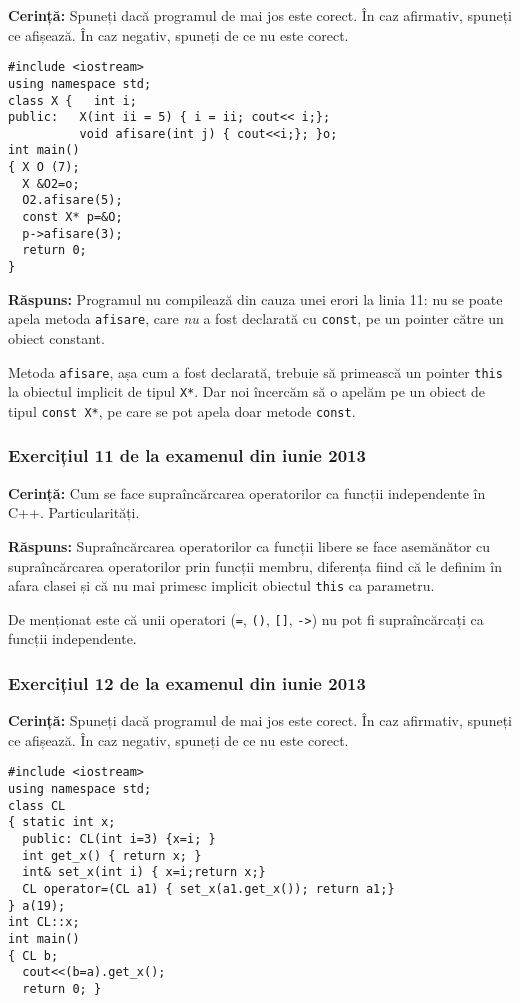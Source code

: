 \textbf{Cerință:} Spuneți dacă programul de mai jos este corect. În caz afirmativ, spuneți ce afișează. În caz negativ, spuneți de ce nu este corect.
\begin{lstlisting}
#include <iostream>
using namespace std;
class X {   int i;
public:   X(int ii = 5) { i = ii; cout<< i;};
          void afisare(int j) { cout<<i;}; }o;
int main()
{ X O (7);
  X &O2=o;
  O2.afisare(5);
  const X* p=&O;
  p->afisare(3);
  return 0;
}
\end{lstlisting}

\textbf{Răspuns:} Programul nu compilează din cauza unei erori la linia 11: nu se poate apela metoda \texttt{afisare}, care \emph{nu} a fost declarată cu \texttt{const}, pe un pointer către un obiect constant.

Metoda \texttt{afisare}, așa cum a fost declarată, trebuie să primească un pointer \texttt{this} la obiectul implicit de tipul \texttt{X*}. Dar noi încercăm să o apelăm pe un obiect de tipul \texttt{const X*}, pe care se pot apela doar metode \texttt{const}.

\subsubsection*{Exercițiul 11 de la examenul din iunie 2013}

\textbf{Cerință:} Cum se face supraîncărcarea operatorilor ca funcții independente în C++. Particularități.

\textbf{Răspuns:} Supraîncărcarea operatorilor ca funcții libere se face asemănător cu supraîncărcarea operatorilor prin funcții membru, diferența fiind că le definim în afara clasei și că nu mai primesc implicit obiectul \texttt{this} ca parametru.

De menționat este că unii operatori (\texttt{=}, \texttt{()}, \texttt{[]}, \texttt{->}) nu pot fi supraîncărcați ca funcții independente.

\subsubsection*{Exercițiul 12 de la examenul din iunie 2013}

\textbf{Cerință:} Spuneți dacă programul de mai jos este corect. În caz afirmativ, spuneți ce afișează. În caz negativ, spuneți de ce nu este corect.
\begin{lstlisting}
#include <iostream>
using namespace std;
class CL
{ static int x;
  public: CL(int i=3) {x=i; }
  int get_x() { return x; }
  int& set_x(int i) { x=i;return x;}
  CL operator=(CL a1) { set_x(a1.get_x()); return a1;}
} a(19);
int CL::x;
int main()
{ CL b;
  cout<<(b=a).get_x();
  return 0; }
\end{lstlisting}

